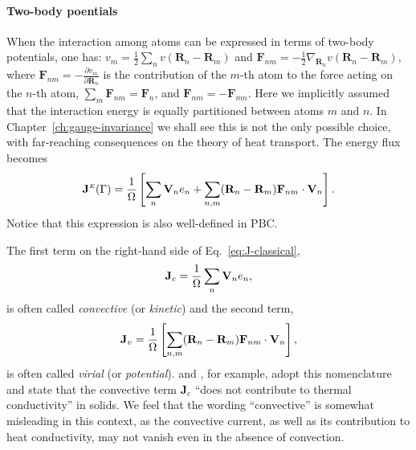 \begin{LEtext}
\paragraph{Two-body poentials}
When the interaction among atoms can be expressed in terms of two-body potentials, one has: $v_m=\frac{1}{2}\sum_n v(\mathbf{R}_n- \mathbf{R}_m)$ and $\mathbf{F}_{n m} = - \frac{1}{2} \nabla_{\mathbf{R}_n} v(\mathbf{R}_n- \mathbf{R}_m)$, where $\mathbf{F}_{n m} = - \frac{\partial v_m}{\partial \mathbf{R}_n}$ is the contribution of the $m$-th atom to the force acting on the $n$-th atom, $\sum_m \mathbf{F}_{n m} = \mathbf{F}_{n}$, and $\mathbf{F}_{n m} = -\mathbf{F}_{m n}$. 
Here we implicitly assumed that the interaction energy is equally partitioned between atoms $m$ and $n$. In Chapter~\ref{ch:gauge-invariance} we shall see this is not the only possible choice, with far-reaching consequences on the theory of heat transport.
The energy flux becomes
\begin{equation}
    \mathbf{J}^\smallE(\rGamma) =
       \frac{1}{\rOmega} \left[ \sum_n \mathbf{V}_n e_n + \sum_{n,m} (\mathbf{R}_n-\mathbf{R}_m) \mathbf{F}_{n m} \cdot \mathbf{V}_n \right]. \label{eq:J-classical-2body}
\end{equation}
Notice that this expression is also well-defined in PBC.

The first term on the right-hand side of Eq.~\eqref{eq:J-classical},
\begin{equation}
    \mathbf{J}_c = \frac{1}{\rOmega} \sum_n \mathbf{V}_n e_n , \label{eq:J-convective}
\end{equation}
is often called \emph{convective} (or \emph{kinetic}) and the second term,
\begin{equation}
    \mathbf{J}_v = \frac{1}{\rOmega} \left[ \sum_{n,m} (\mathbf{R}_n-\mathbf{R}_m) \mathbf{F}_{n m} \cdot \mathbf{V}_n \right], \label{eq:J-virial}
\end{equation}
is often called \emph{virial} (or \emph{potential}).
\citet{Fan2015} and \citet{Carbogno:2017gc}, for example, adopt this nomenclature and state that the convective term $\mathbf{J}_c$ ``does not contribute to thermal conductivity'' in solids. 
We feel that the wording ``convective'' is somewhat misleading in this context, as the convective current, as well as its contribution to heat conductivity, may not vanish even in the absence of convection.


\end{LEtext}
